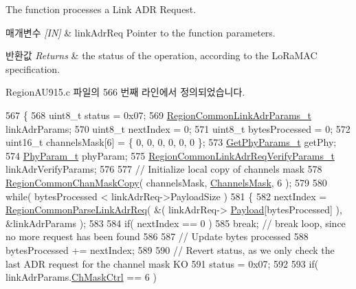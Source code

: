 The function processes a Link A\+DR Request. 


\begin{DoxyParams}{매개변수}
{\em \mbox{[}\+I\+N\mbox{]}} & link\+Adr\+Req Pointer to the function parameters.\\
\hline
\end{DoxyParams}

\begin{DoxyRetVals}{반환값}
{\em Returns} & the status of the operation, according to the Lo\+Ra\+M\+AC specification. \\
\hline
\end{DoxyRetVals}


Region\+A\+U915.\+c 파일의 566 번째 라인에서 정의되었습니다.


\begin{DoxyCode}
567 \{
568     uint8\_t status = 0x07;
569     \mbox{\hyperlink{structs_region_common_link_adr_params}{RegionCommonLinkAdrParams\_t}} linkAdrParams;
570     uint8\_t nextIndex = 0;
571     uint8\_t bytesProcessed = 0;
572     uint16\_t channelsMask[6] = \{ 0, 0, 0, 0, 0, 0 \};
573     \mbox{\hyperlink{structs_get_phy_params}{GetPhyParams\_t}} getPhy;
574     \mbox{\hyperlink{unionu_phy_param}{PhyParam\_t}} phyParam;
575     \mbox{\hyperlink{structs_region_common_link_adr_req_verify_params}{RegionCommonLinkAdrReqVerifyParams\_t}} linkAdrVerifyParams;
576 
577     \textcolor{comment}{// Initialize local copy of channels mask}
578     \mbox{\hyperlink{group___r_e_g_i_o_n_c_o_m_m_o_n_ga95f5199d490113269fae7f2e0569e9a0}{RegionCommonChanMaskCopy}}( channelsMask, \mbox{\hyperlink{_region_a_u915_8c_a2188957b5ca6af8092154d7ccbfa5757}{ChannelsMask}}, 6 );
579 
580     \textcolor{keywordflow}{while}( bytesProcessed < linkAdrReq->PayloadSize )
581     \{
582         nextIndex = \mbox{\hyperlink{group___r_e_g_i_o_n_c_o_m_m_o_n_ga8403c78482dbb901014dba48b75d78e8}{RegionCommonParseLinkAdrReq}}( &( linkAdrReq->
      \mbox{\hyperlink{structs_link_adr_req_params_a3dfbfe76c8f3bd25765750487b815147}{Payload}}[bytesProcessed] ), &linkAdrParams );
583 
584         \textcolor{keywordflow}{if}( nextIndex == 0 )
585             \textcolor{keywordflow}{break}; \textcolor{comment}{// break loop, since no more request has been found}
586 
587         \textcolor{comment}{// Update bytes processed}
588         bytesProcessed += nextIndex;
589 
590         \textcolor{comment}{// Revert status, as we only check the last ADR request for the channel mask KO}
591         status = 0x07;
592 
593         \textcolor{keywordflow}{if}( linkAdrParams.\mbox{\hyperlink{structs_region_common_link_adr_params_ac5e1891f30a172b2ce39bc3498e1843d}{ChMaskCtrl}} == 6 )

\end{DoxyCode}
